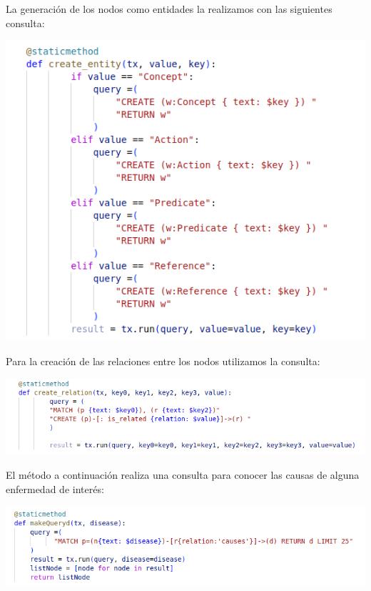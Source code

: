 \documentclass[10pt]{article} %
\begin{document}
	La generación de los nodos como entidades la realizamos con las siguientes consulta:
	
	 \begin{center}
		\includegraphics[scale=0.5]{../images/imageEntities}
	\end{center}
	
	Para la creación de las relaciones entre los nodos utilizamos la consulta:
	
	 \begin{center}
		\includegraphics[scale=0.5]{../images/imageRelations}
	\end{center}

	El método a continuaci\'on realiza una consulta para conocer las causas de alguna enfermedad de interés:
	
	\begin{center}
		\includegraphics[scale=0.5]{../images/imageQuery}
	\end{center}
\end{document}
